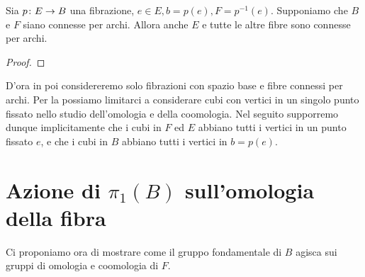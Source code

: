 \begin{proposition}
Sia $p\colon E\to B$ una fibrazione, $e\in E,b=p(e),F=p^{-1}(e)$. Supponiamo che $B$ e $F$ siano connesse per archi. Allora anche $E$ e tutte le altre fibre sono connesse per archi.
\end{proposition}
\begin{proof}

\end{proof}
D'ora in poi considereremo solo fibrazioni con spazio base e fibre connessi per archi. Per la  possiamo limitarci a considerare cubi con vertici in un singolo punto fissato nello studio dell'omologia e della coomologia. Nel seguito supporremo dunque implicitamente che i cubi in $F$ ed $E$ abbiano tutti i vertici in un punto fissato $e$, e che i cubi in $B$ abbiano tutti i vertici in $b=p(e)$.

\section{Azione di $\pi_1(B)$ sull'omologia della fibra}

Ci proponiamo ora di mostrare come il gruppo fondamentale di $B$ agisca sui gruppi di omologia e coomologia di $F$.

